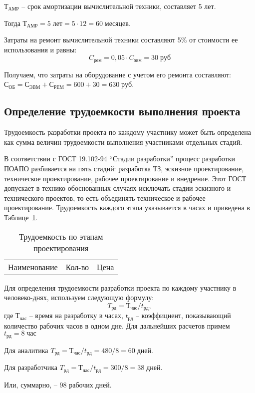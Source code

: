 $Т_{АМР}$ – срок амортизации вычислительной техники, составляет 5 лет. 

Тогда $Т_{АМР} = 5 \; лет =5 \cdot 12 = 60 \; месяцев $.

Затраты на ремонт вычислительной техники составляют 5\% от  стоимости ее использования и равны:
$$C_{рем} = 0,05 \cdot C_{эвм} = 30 \; руб$$

Получаем, что  затраты на оборудование с учетом его ремонта составляют:
$ С_{ОБ} = С_{ЭВМ} + С_{РЕМ} =  600 + 30 = 630 \; руб$.

\subsection{Определение трудоемкости выполнения проекта}
Трудоемкость разработки проекта по каждому участнику может быть определена как сумма величин трудоемкости выполнения участниками отдельных стадий.

В соответствии с ГОСТ 19.102-94 “Стадии разработки” процесс разработки ПОАПО разбивается на пять стадий: разработка ТЗ, эскизное проектирование, техническое проектирование, рабочее проектирование и внедрение. Этот ГОСТ допускает в технико-обоснованных случаях исключать стадии эскизного и технического проектов, то есть объединять техническое и рабочее проектирование. Трудоемкость каждого этапа указывается в часах и приведена в  Таблице~\ref{tab:b}.

\begin{table}[htb]
	\caption{Трудоемкость по этапам проектирования}\label{tab:b}
    \centering
        \begin{tabular}{|l|l|l|}
        		\hline
        		Наименование & Кол-во & Цена \\
        		
        \end{tabular}   		
\end{table}

Для определения трудоемкости разработки проекта по каждому участнику в человеко-днях, используем следующую формулу: 
$$ T_{рд} = Т_{час}/t_{рд},$$
где $Т_{час}$ – время на разработку в часах, $t_{рд}$ – коэффициент, показывающий количество рабочих часов в одном дне. Для дальнейших расчетов примем $t_{рд} = 8\; час$

Для аналитика $T_{рд} = Т_{час}/t_{рд} = 480/8 = 60 \; дней$.

Для разработчика $T_{рд} = Т_{час}/t_{рд} = 300/8 = 38 \; дней$.

Или, суммарно, – 98 рабочих дней.

